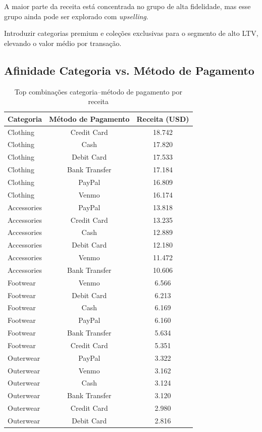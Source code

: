 \documentclass[12pt,a4paper]{article}
\begin{document}
\begin{insightbox}
A maior parte da receita está concentrada no grupo de alta fidelidade, mas esse grupo ainda pode ser explorado com \textit{upselling}.
\end{insightbox}
\begin{actionbox}
Introduzir categorias premium e coleções exclusivas para o segmento de alto LTV, elevando o valor médio por transação.
\end{actionbox}

\subsection{Afinidade Categoria vs. Método de Pagamento}
\begin{table}[H]
\centering
\caption{Top combinações categoria–método de pagamento por receita}
\label{tab:pagamento_categoria}
\begin{tabular}{lcc}
\toprule
\rowcolor{lightgray} \textbf{Categoria} & \textbf{Método de Pagamento} & \textbf{Receita (USD)} \\
\midrule
Clothing    & Credit Card  & 18.742 \\
Clothing    & Cash         & 17.820 \\
Clothing    & Debit Card   & 17.533 \\
Clothing    & Bank Transfer& 17.184 \\
Clothing    & PayPal       & 16.809 \\
Clothing    & Venmo        & 16.174 \\
Accessories & PayPal       & 13.818 \\
Accessories & Credit Card  & 13.235 \\
Accessories & Cash         & 12.889 \\
Accessories & Debit Card   & 12.180 \\
Accessories & Venmo        & 11.472 \\
Accessories & Bank Transfer& 10.606 \\
Footwear    & Venmo        & 6.566  \\
Footwear    & Debit Card   & 6.213  \\
Footwear    & Cash         & 6.169  \\
Footwear    & PayPal       & 6.160  \\
Footwear    & Bank Transfer& 5.634  \\
Footwear    & Credit Card  & 5.351  \\
Outerwear   & PayPal       & 3.322  \\
Outerwear   & Venmo        & 3.162  \\
Outerwear   & Cash         & 3.124  \\
Outerwear   & Bank Transfer& 3.120  \\
Outerwear   & Credit Card  & 2.980  \\
Outerwear   & Debit Card   & 2.816  \\
\bottomrule
\end{tabular}
\end{table}
\end{document}
